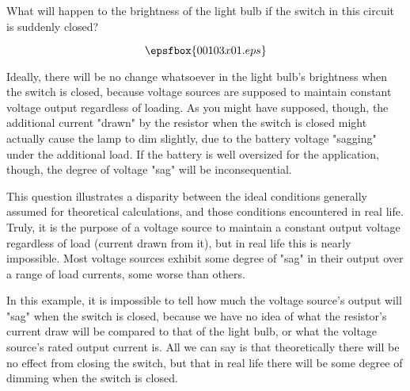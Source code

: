 

What will happen to the brightness of the light bulb if the switch in this circuit is suddenly closed?

$$\epsfbox{00103x01.eps}$$







Ideally, there will be no change whatsoever in the light bulb's brightness when the switch is closed, because voltage sources are supposed to maintain constant voltage output regardless of loading.  As you might have supposed, though, the additional current "drawn" by the resistor when the switch is closed might actually cause the lamp to dim slightly, due to the battery voltage "sagging" under the additional load.  If the battery is well oversized for the application, though, the degree of voltage "sag" will be inconsequential.







This question illustrates a disparity between the ideal conditions generally assumed for theoretical calculations, and those conditions encountered in real life.  Truly, it is the purpose of a voltage source to maintain a constant output voltage regardless of load (current drawn from it), but in real life this is nearly impossible.  Most voltage sources exhibit some degree of "sag" in their output over a range of load currents, some worse than others.

In this example, it is impossible to tell how much the voltage source's output will "sag" when the switch is closed, because we have no idea of what the resistor's current draw will be compared to that of the light bulb, or what the voltage source's rated output current is.  All we can say is that theoretically there will be no effect from closing the switch, but that in real life there will be some degree of dimming when the switch is closed.




